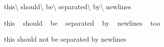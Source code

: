 this\textbackslash{} should\textbackslash{} be\textbackslash{} separated\textbackslash{} by\textbackslash{} newlines

this ~\newline
 should ~\newline
 be ~\newline
 separated ~\newline
 by ~\newline
 newlines ~\newline
 too

this should not be separated by newlines 